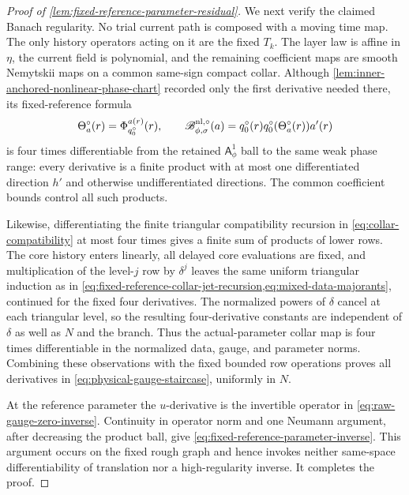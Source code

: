 \begin{proof}[Proof of
\cref{lem:fixed-reference-parameter-residual}]
We next verify the claimed Banach regularity.  No trial current path is
composed with a moving time map.  The only history operators acting on it
are the fixed $T_k$.  The layer law is affine in $\eta$, the current field
is polynomial, and the remaining coefficient maps are smooth Nemytskii
maps on a common same-sign compact collar.  Although
\cref{lem:inner-anchored-nonlinear-phase-chart} recorded only the first
derivative needed there, its fixed-reference formula
\[
 \Theta_a^\circ(r)=\Phi_{q_0^\circ}^{a(r)}(r),
 \qquad
 \mathscr B_{\phi,\sigma}^{\rm nl,\circ}(a)
 =q_0^\circ(r)q_0^\circ(\Theta_a^\circ(r))a'(r)
\]
is four times differentiable from the retained $\mathsf A_\phi^1$ ball
to the same weak phase range: every derivative is a finite product with at
most one differentiated direction $h'$ and otherwise undifferentiated
directions.  The common coefficient bounds control all such products.

Likewise, differentiating the finite triangular compatibility recursion
in \cref{eq:collar-compatibility} at most four times gives a finite sum of
products of lower rows.  The core history enters linearly, all delayed
core evaluations are fixed, and multiplication of the level-$j$ row by
$\delta^j$ leaves the same uniform triangular induction as in
\cref{eq:fixed-reference-collar-jet-recursion,eq:mixed-data-majorants},
continued for the fixed four derivatives.  The normalized powers of
$\delta$ cancel at each triangular level, so the resulting four-derivative
constants are independent of $\delta$ as well as $N$ and the branch.
Thus the actual-parameter collar map is four times differentiable in the
normalized data, gauge, and parameter norms.  Combining these observations
with the fixed bounded row operations proves all derivatives in
\cref{eq:physical-gauge-staircase}, uniformly in $N$.

At the reference parameter the $u$-derivative is the invertible operator
in \cref{eq:raw-gauge-zero-inverse}.  Continuity in operator norm and one
Neumann argument, after decreasing the product ball, give
\cref{eq:fixed-reference-parameter-inverse}.  This argument occurs on the
fixed rough graph and hence invokes neither same-space differentiability of
translation nor a high-regularity inverse.  It completes the proof.
\end{proof}


